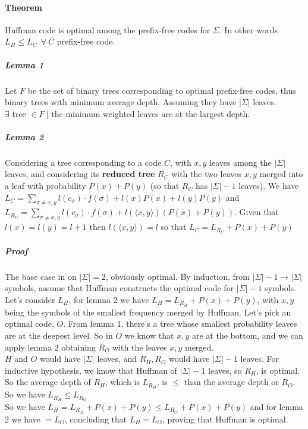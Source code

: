 \documentclass[10pt]{report}
\begin{document}
\paragraph{Theorem} Huffman code is optimal among the prefix-free codes for $\Sigma$. In other words $L_H \leq L_C\:\:\forall\:C$ prefix-free code.
\subparagraph{Lemma 1} Let $F$ be the set of binary trees corresponding to optimal prefix-free codes, thus binary trees with minimum average depth. Assuming they have $|\Sigma|$ leaves.\\
$\exists$ tree $\in F\:|$ the minimum weighted leaves are at the largest depth.
\subparagraph{Lemma 2} Considering a tree corresponding to a code $C$, with $x,y$ leaves among the $|\Sigma|$ leaves, and considering its \textbf{reduced tree} $R_C$ with the two leaves $x,y$ merged into a leaf with probability $P(x) + P(y)$ (so that $R_C$ has $|\Sigma|-1$ leaves). We have $L_C  = \sum_{\sigma\neq x,y} l(c_\sigma)\cdot f(\sigma)+l(x)P(x) + l(y)P(y)$ and $L_{R_C}  = \sum_{\sigma\neq x,y} l(c_\sigma)\cdot f(\sigma)+l(\langle x,y\rangle)(P(x)+P(y))$. Given that $l(x) = l(y) = l + 1$ then $l(\langle x,y\rangle) = l$ so that $L_C = L_{R_C} + P(x) + P(y)$
\subparagraph{Proof} The base case in on $|\Sigma| = 2$, obviously optimal. By induction, from $|\Sigma|-1 \rightarrow |\Sigma|$ symbols, assume that Huffman constructs the optimal code for $|\Sigma|-1$ symbols.\\
Let's consider $L_H$, for lemma 2 we have $L_H = L_{R_H} + P(x) + P(y)$, with $x,y$ being the symbols of the smallest frequency merged by Huffman. Let's pick an optimal code, $O$. From lemma 1, there's a tree whose smallest probability leaves are at the deepest level. So in $O$ we know that $x,y$ are at the bottom, and we can apply lemma 2 obtaining $R_O$ with the leaves $x,y$ merged.\\
$H$ and $O$ would have $|\Sigma|$ leaves, and $R_H,R_O$ would have $|\Sigma|-1$ leaves. For inductive hypothesis, we know that Huffman of $|\Sigma|-1$ leaves, so $R_H$, is optimal. So the average depth of $R_H$, which is $L_{R_H}$, is $\leq$ than the average depth or $R_O$. So we have $L_{R_H}\leq L_{R_O}$\\
So we have $L_H = L_{R_H} + P(x) + P(y) \leq L_{R_O} + P(x) + P(y)$ and for lemma 2 we have $= L_O$, concluding that $L_H = L_O$, proving that Huffman is optimal.
\end{document}
